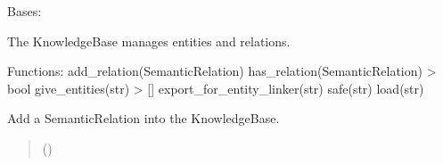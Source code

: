 \documentclass[letterpaper,10pt,english]{sphinxmanual}
\begin{document}
\begin{fulllineitems}
\label{\detokenize{medextractor.knowledge:medextractor.knowledge.base.KnowledgeBase}}
\pysigstartsignatures
{}
\pysigstopsignatures
\sphinxAtStartPar
Bases: 

\sphinxAtStartPar
The KnowledgeBase manages entities and relations.

\sphinxAtStartPar
Functions:
add\_relation(SemanticRelation)
has\_relation(SemanticRelation) \sphinxhyphen{}\textgreater{} bool
give\_entities(str) \sphinxhyphen{}\textgreater{} {[}{]}
export\_for\_entity\_linker(str)
safe(str)
load(str)

\begin{fulllineitems}
\label{\detokenize{medextractor.knowledge:medextractor.knowledge.base.KnowledgeBase.add_relation}}
\pysigstartsignatures
{}
\pysigstopsignatures
\sphinxAtStartPar
Add a SemanticRelation into the KnowledgeBase.
\begin{quote}\begin{description}
\sphinxAtStartPar
{} ({\hyperref[\detokenize{medextractor.knowledge:medextractor.knowledge.semantics.SemanticRelation}]{}}) \textendash{} 

\end{description}\end{quote}

\end{fulllineitems}



\end{fulllineitems}
\end{document}
